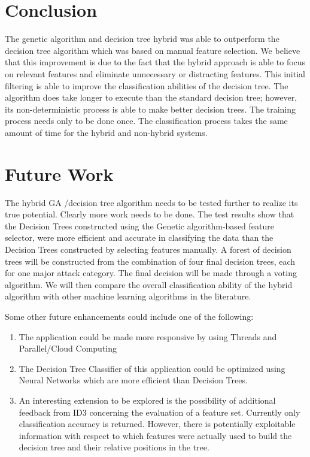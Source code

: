 \documentclass[conference]{IEEEtran}
\begin{document}
\section{Conclusion}
The genetic algorithm and decision tree hybrid was able to
outperform the decision tree algorithm which was based on manual feature selection.
We believe that this improvement is due to the fact that the
hybrid approach is able to focus on relevant features and
eliminate unnecessary or distracting features. This initial filtering
is able to improve the classification abilities of the decision tree.
The algorithm does take longer to execute than the standard
decision tree; however, its non-deterministic process is able to
make better decision trees. The training process needs only to be
done once. The classification process takes the same amount of
time for the hybrid and non-hybrid systems.

\section{Future Work}
The hybrid GA /decision tree algorithm needs to be tested
further to realize its true potential. Clearly more work needs to be done. 
The test results show that the Decision Trees constructed using the Genetic algorithm-based feature selector, were more efficient and accurate in classifying the data than the Decision Trees constructed by selecting features manually. A forest of decision trees will be
constructed from the combination of four final decision trees,
each for one major attack category. The final decision will be
made through a voting algorithm. We will then compare the
overall classification ability of the hybrid algorithm with other
machine learning algorithms in the literature.

Some other future enhancements could include one of the following:
\begin{enumerate}
\item{The application could be made more responsive by using Threads and Parallel/Cloud Computing}
\item{The Decision Tree Classifier of this application could be optimized using Neural Networks which are more efficient than Decision Trees.}
\item{An interesting extension to be explored is the possibility of
additional feedback from ID3 concerning the evaluation of a
feature set. Currently only classification accuracy is returned.
However, there is potentially exploitable information with
respect to which features were actually used to build the
decision tree and their relative positions in the tree.}

\end{enumerate}
\end{document}
